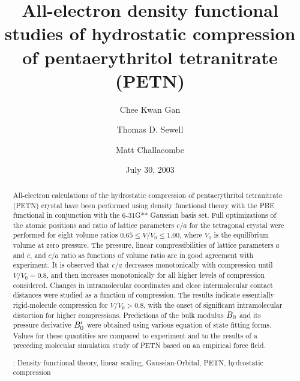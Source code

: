 \documentclass[prb,aps,nobibnotes,twocolumn,doublespace,twocolumngrid,superbib]{revtex4}
\begin{document}
\title[Short Title]{ 
All-electron density functional studies of hydrostatic compression of 
pentaerythritol tetranitrate (PETN)}
\author{Chee Kwan Gan\footnotemark[1]}
\author{Thomas D. Sewell\footnotemark[2]}
\author{Matt Challacombe\footnotemark[3]}

\date{July 30, 2003}

\begin{abstract}
All-electron calculations of the hydrostatic compression of
pentaerythritol tetranitrate (PETN) crystal have been performed using
density functional theory with the PBE functional in conjunction with
the 6-31G** Gaussian basis set.  Full optimizations of the atomic
positions and ratio of lattice parameters $c/a$ for the tetragonal
crystal were performed for eight volume ratios $0.65
\le V/V_0 \le 1.00$, where $V_0$ is the equilibrium volume at zero
pressure.  The pressure, linear compressibilities of lattice
parameters $a$ and $c$, and $c/a$ ratio as functions of volume ratio
are in good agreement with experiment.  It is observed that
$c/a$ decreases monotonically with compression until $V/V_0=0.8$, 
and then increases monotonically for all higher levels of compression
considered.  Changes in intramolecular coordinates
and close intermolecular contact distances were studied as a function
of compression.  The results indicate essentially rigid-molecule compression
for $V/V_0 >0.8$, with the onset of significant intramolecular distortion
for higher compressions.  Predictions of the bulk modulus $B_0$ and its 
pressure derivative ${B'_0}$ were obtained using various equation of 
state fitting forms. Values for these quantities are compared to 
experiment and to the results of a preceding molecular simulation study 
of PETN based on an empirical force field.

\smallskip
{}: Density functional theory, linear scaling, 
Gaussian-Orbital, PETN, hydrostatic compression
\end{abstract}

\maketitle

\end{document}
